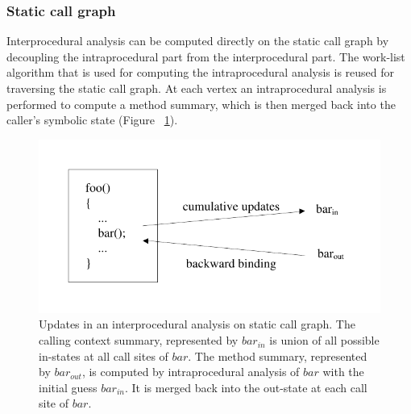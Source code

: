 


\subsubsection{Static call graph}

Interprocedural analysis can be computed directly on the static call graph by decoupling the intraprocedural part from the interprocedural part. The work-list algorithm that is used for computing the intraprocedural analysis is reused for traversing the static call graph. At each vertex an intraprocedural analysis is performed to compute a method summary, which is then merged back into the caller's symbolic state (Figure ~\ref{fig:StaticCallGraphUpdates}).

\begin{figure}
\begin{center}
\includegraphics[scale=0.8]{StaticCallGraphUpdates.pdf}
\end{center}
\caption{Updates in an interprocedural analysis on static call graph. The calling context summary, represented by $bar_{in}$ is union of all possible in-states at all call sites of $bar$. The method summary, represented by $bar_{out}$, is computed by intraprocedural analysis of $bar$ with the initial guess $bar_{in}$. It is merged back into the out-state at each call site of $bar$.}
\label{fig:StaticCallGraphUpdates}
\end{figure}

